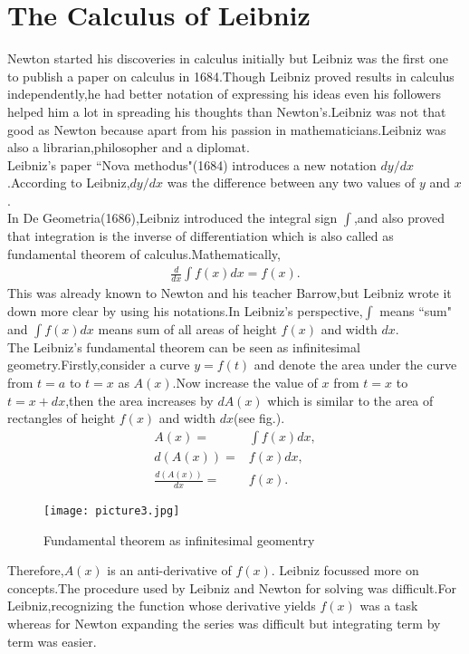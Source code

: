 \documentclass[a4paper,reqno,11pt]{book}
\theoremstyle{plain}%
\theoremstyle{definition}
\begin{document}
\section{The Calculus of Leibniz}
Newton started his discoveries in calculus initially but Leibniz was the first one to publish a paper on calculus in 1684.Though Leibniz proved results in calculus independently,he had better notation of expressing his ideas even his followers helped him a lot in spreading his thoughts than Newton's.Leibniz was not that good as Newton because apart from his passion in mathematicians.Leibniz was also a librarian,philosopher and a diplomat.\\
Leibniz's paper ``Nova methodus"(1684) introduces a new notation $dy/dx$.According to Leibniz,$dy/dx$ was the difference between any two values of $y$ and $x$.\\
In De Geometria(1686),Leibniz introduced the integral sign $\int$,and also proved that integration is the inverse of differentiation which is also called as fundamental theorem of calculus.Mathematically,
\begin{eqnarray*}
    \frac{d}{dx}\int f(x)dx=f(x).
\end{eqnarray*}
This was already known to Newton and his teacher Barrow,but Leibniz wrote it down more clear by using his notations.In Leibniz's perspective,$\int$ means ``sum" and $\int f(x)dx$ means sum of all areas of height $f(x)$ and width $dx$.\\
\indent The Leibniz's fundamental theorem can be seen as infinitesimal geometry.Firstly,consider a curve $y=f(t)$ and denote the area under the curve from $t=a$ to $t=x$ as $A(x)$.Now increase the value of $x$ from $t=x$ to $t=x+dx$,then the area increases by $dA(x)$ which is similar to the area of rectangles of height $f(x)$ and width $dx$(see fig.).
\begin{align*}
    A(x)=&\int f(x)dx,\\
    d(A(x))=&f(x)dx,\\
    \frac{d(A(x))}{dx}=&f(x).
\end{align*}
\begin{figure}[h]
    \centering
    \texttt{[image: picture3.jpg]}
    \caption{Fundamental theorem as infinitesimal geomentry}
    \label{fig:picture3}
\end{figure}
Therefore,$A(x)$ is an anti-derivative of $f(x)$.
Leibniz focussed more on concepts.The procedure used by Leibniz and Newton for solving was difficult.For Leibniz,recognizing the function whose derivative yields $f(x)$ was a task whereas for Newton expanding the series was difficult but integrating term by term was easier.\\
\end{document}
